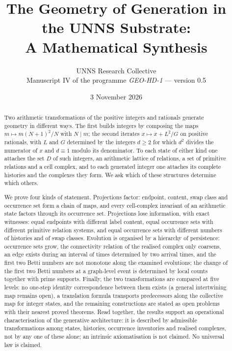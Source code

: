 \documentclass[11pt]{article}
\title{The Geometry of Generation in the UNNS Substrate:\\ A Mathematical Synthesis}
\author{UNNS Research Collective\\[2pt]\small Manuscript IV of the programme \emph{GEO-HD-1} --- version 0.5}
\date{3 November 2026}
\theoremstyle{plain}
\theoremstyle{definition}
\theoremstyle{remark}
\begin{document}
\maketitle
\begin{abstract}
Two arithmetic transformations of the positive integers and rationals generate geometry in different ways. The first builds integers by composing the maps $m\mapsto m(N+1)^2/N$ with $N\mid m$; the second iterates $x\mapsto x+L^2/G$ on positive rationals, with $L$ and $G$ determined by the integers $d\ge2$ for which $d^2$ divides the numerator of $x$ and $d\equiv1$ modulo its denominator. To each state of either kind one attaches the set $D$ of such integers, an arithmetic lattice of relations, a set of primitive relations and a cell complex, and to each generated integer one attaches its complete histories and the complexes they form. We ask which of these structures determine which others.

We prove four kinds of statement. Projections factor: endpoint, content, swap class and occurrence set form a chain of maps, and every cell-complex invariant of an arithmetic state factors through its occurrence set. Projections lose information, with exact witnesses: equal endpoints with different label content, equal occurrence sets with different primitive relation systems, and equal occurrence sets with different numbers of histories and of swap classes. Evolution is organised by a hierarchy of persistence: occurrence sets grow, the connectivity relation of the realised complex only coarsens, an edge exists during an interval of times determined by two arrival times, and the first two Betti numbers are not monotone along the examined evolutions; the change of the first two Betti numbers at a graph-level event is determined by local counts together with prime supports. Finally, the two transformations are compared at five levels: no one-step identity correspondence between them exists (a general intertwining map remains open), a translation formula transports predecessors along the collective map for integer states, and the remaining constructions are stated as open problems with their nearest proved theorems. Read together, the results support an operational characterisation of the generative architecture: it is described by admissible transformations among states, histories, occurrence inventories and realised complexes, not by any one of these alone; an intrinsic axiomatisation is not claimed. No universal law is claimed.
\end{abstract}
\tableofcontents

















\appendix






\end{document}
